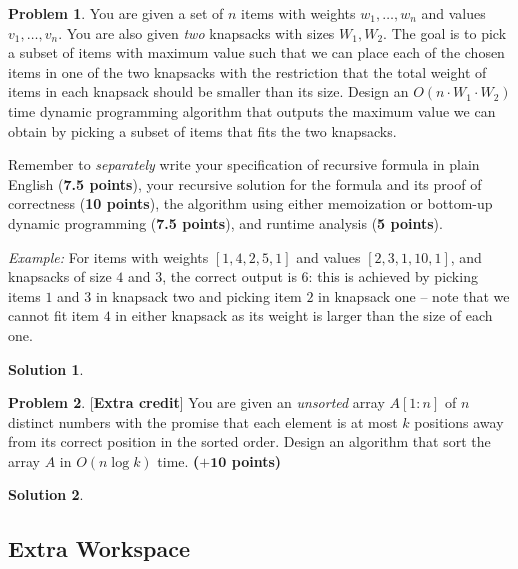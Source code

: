 \documentclass{article}
\theoremstyle{definition}
\newtheorem{problem}{Problem}
\newtheorem*{solution*}{Solution}
\newenvironment{solution}{\begin{solution*}}{{} \end{solution*}}
\newcommand{\grade}[1]{\hfill{\textbf{($\mathbf{#1}$ points)}}}
\begin{document}
\newpage
\begin{problem}\label{DP}
	You are given a set of $n$ items with weights $w_1,\ldots,w_n$ and values $v_1,\ldots,v_n$. You are also given \emph{two} knapsacks with sizes $W_1,W_2$. The goal is to pick a subset of items with maximum value such that 
	we can place each of the chosen items in one of the two knapsacks with the restriction that the total weight of items in each knapsack should be smaller than its size. Design an $O(n \cdot W_1 \cdot W_2)$ time dynamic programming algorithm
	that outputs the maximum value we can obtain by picking a subset of items that fits the two knapsacks.
	
	Remember to \emph{separately} write your specification of recursive formula in plain English (\textbf{7.5 points}), your recursive solution for the formula and its proof of correctness (\textbf{10 points}), the algorithm using either memoization 
	or bottom-up dynamic programming (\textbf{7.5 points}), and runtime analysis (\textbf{5 points}). 
	
	\emph{Example:} For items with weights $[1,4,2,5,1]$ and values $[2,3,1,10,1]$, and knapsacks of size $4$ and $3$, the correct output is $6$: this is achieved by picking items $1$ and $3$ in knapsack two and picking item $2$ in knapsack one -- note that we cannot fit item $4$ in either knapsack as its weight is larger than the size of each one.  


\end{problem}

 
 \begin{solution}
\end{solution}

\newpage

\begin{problem}\label{extra}[\textbf{Extra credit}]
	You are given an \emph{unsorted} array $A[1:n]$ of $n$ distinct numbers with the promise that each element is at most $k$ positions away from its correct position in the sorted order. 
	Design an algorithm that sort the array $A$ in $O(n\log{k})$ time. \grade{+10}

\end{problem}

\begin{solution}
\end{solution}

\newpage
\subsection*{Extra Workspace}
\end{document}
